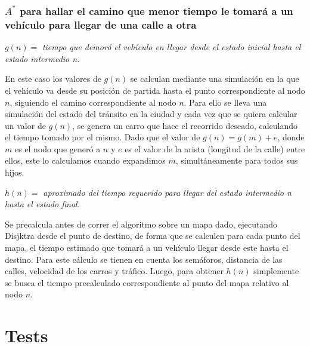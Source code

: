 \documentclass[colorinlistoftodos,twoside,twocolumn]{article} %
\begin{document}
	\subsubsection{$ A^{*} $ para hallar el camino que menor tiempo le tomar\'a a un veh\'iculo para llegar de una calle a otra}
	
	\begin{center}
		\textit{$ g(n) = $ } \textit{tiempo que demor\'o el veh\'iculo en llegar desde el estado inicial hasta el \hspace{8em} estado intermedio n.}
	\end{center}	

	En este caso los valores de $g(n)$ se calculan mediante una simulaci\'on en la que el veh\'iculo va desde su posici\'on de partida hasta el punto correspondiente al nodo $n$, siguiendo el camino correspondiente al nodo $n$. Para ello se lleva una simulaci\'on del estado del tr\'ansito en la ciudad y cada vez que se quiera calcular un valor de $g(n)$, se genera un carro que hace el recorrido deseado, calculando el tiempo tomado por el mismo. Dado que el valor de $g(n) = g(m) + e$, donde $m$ es el nodo que gener\'o a $n$ y $e$ es el valor de la arista (longitud de la calle) entre ellos, este lo calculamos cuando expandimos $m$, simult\'aneamente para todos sus hijos.  

		
	\begin{center}
		\vspace{0.5em}
		\textit{$ h(n) = $ } \textit{aproximado del tiempo requerido para llegar del estado intermedio n \hspace{8em} hasta el estado final.}
	\end{center}

	Se precalcula antes de correr el algoritmo sobre un mapa dado, ejecutando Disjktra desde el punto de destino, de forma que se calculen para cada punto del mapa, el tiempo estimado que tomar\'a a un veh\'iculo llegar desde este hasta el destino. Para este c\'alculo se tienen en cuenta los sem\'aforos, distancia de las calles, velocidad de los carros y tr\'afico. Luego, para obtener $ h(n) $ simplemente se busca el tiempo precalculado correspondiente al punto del mapa relativo al nodo $n$.
	

	\section{Tests}
	
\end{document}
